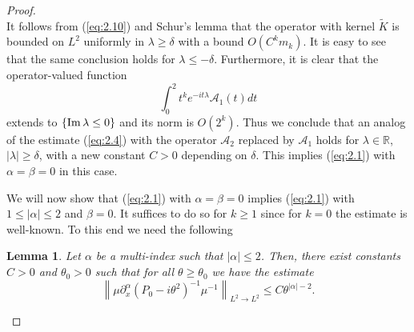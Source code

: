 \documentclass[11pt]{amsart}
\newtheorem{lemma}[Theorem]{Lemma}
\numberwithin{equation}{section}
\def\R{{\mathbb R}}
\begin{document}
\begin{proof}
\begin{equation}
 \end{equation}
 It follows from (\ref{eq:2.10}) and Schur's lemma that the operator with kernel $\widetilde K$
is bounded on $L^2$ uniformly in $\lambda\ge\delta$ with a bound $O\left(C^km_k\right)$.
It is easy to see that the same conclusion holds for $\lambda\le -\delta$.
Furthermore, it is clear that the operator-valued function
\begin{equation*}
\int_0^2 t^ke^{-it\lambda}\mathcal{A}_1(t)dt
\end{equation*}
extends to $\{{\rm Im}\,\lambda\le 0\}$ and its norm is $O\left(2^k\right)$.  Thus we conclude that an analog of the estimate 
 (\ref{eq:2.4}) with the operator $\mathcal{A}_2$ replaced by $\mathcal{A}_1$ holds for $\lambda\in\R$, $|\lambda|\ge\delta$, 
 with a new constant $C>0$ depending on $\delta$. 
 This implies (\ref{eq:2.1}) with $\alpha=\beta=0$ in this case.
 
 We will now show that (\ref{eq:2.1}) with $\alpha=\beta=0$ implies (\ref{eq:2.1}) with $1\le |\alpha|\le 2$ and $\beta=0$. 
 It suffices to do so for $k\ge 1$ since for $k=0$ the estimate is well-known. 
 To this end we need the following
 
 \begin{lemma} \label{2.2} 
Let $\alpha$ be a multi-index such that $|\alpha|\le 2$. 
 Then, there exist constants $C > 0$ and $\theta_0 > 0$ such that for all $\theta \ge \theta_0$ we have the estimate
\begin{equation}\label{eq:2.11}
\left\|\mu\partial_x^\alpha\left(P_0-i\theta^2\right)^{-1}\mu^{-1}
\right\|_{L^2\to L^2}\le C \theta^{|\alpha|-2}.
\end{equation}
\end{lemma}


\end{proof}
\end{document}
